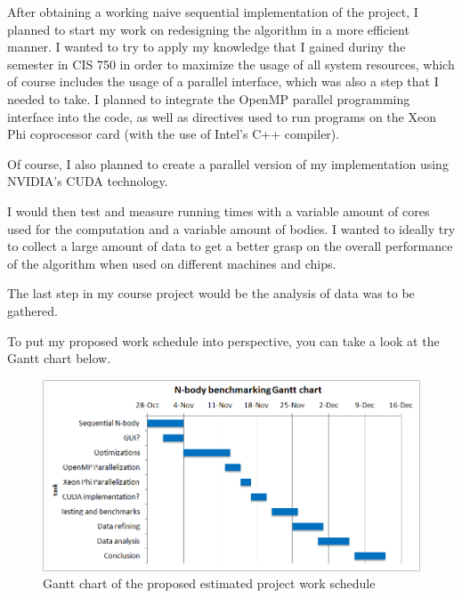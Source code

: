 \documentclass[journal]{IEEEtran}
\begin{document}
		After obtaining a working naive sequential implementation of the project, I planned to start my work on redesigning the algorithm in a more efficient manner. I wanted to try to apply my knowledge that I gained duriny the semester in CIS 750 in order to maximize the usage of all system resources, which of course includes the usage of a parallel interface, which was also a step that I needed to take. I planned to integrate the OpenMP parallel programming interface into the code, as well as directives used to run programs on the Xeon Phi coprocessor card (with the use of Intel's C++ compiler).
		
		Of course, I also planned to create a parallel version of my implementation using NVIDIA’s CUDA technology.
		
		I would then test and measure running times with a variable amount of cores used for the computation and a variable amount of bodies. I wanted to ideally try to collect a large amount of data to get a better grasp on the overall performance of the algorithm when used on different machines and chips.
		
		The last step in my course project would be the analysis of data was to be gathered.
		
		To put my proposed work schedule into perspective, you can take a look at the Gantt chart below.
		
		\begin{figure}[ht]
			\centering
			\includegraphics[width=.45\textwidth]{ganttchart.png}
			\caption{Gantt chart of the proposed estimated project work schedule}
		\end{figure} 
		
	
	
\end{document}

